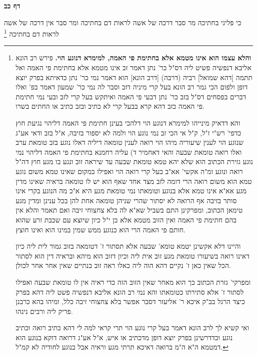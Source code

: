 \documentclass[12pt, openany]{book}
\newcommand{\sethebfont}{
\fontsize{10.5pt}{21.0pt} \selectfont
}
\newcommand{\twocol}[1]{
	{\sethebfont \begin{multicols}{2}
			#1
	\end{multicols}}	
}
\newcommand{\sectname}{}
\newcommand{\newsection}[1]{
	\addcontentsline{toc}{section}{#1}
	\renewcommand{\sectname}{#1}	
	\vspace{-\baselineskip}
	\begin{center}
		\textbf{%
\fontsize{16pt}{16pt}\selectfont
			#1}
	\end{center}
	\vspace{-\baselineskip}
	\nopagebreak
}
\newcommand{\footnotecomment}[1]{\footnote{#1}}
\newcommand{\commenta}[1]{\footnotecomment{#1}}
\begin{document}
\newsection{דף כב}
\twocol{כי פליגי בחתיכה  מר סבר דרכה של אשה לראות דם בחתיכה ומר סבר אין דרכה של אשה לראות דם בחתיכה 
\commenta{\textbf{והלא עצמו הוא אינו מטמא אלא בחתימת פי האמה, למימרא דנוגע הוי.}  פירש רב הונא אליבא דנפשיה פשיט ליה דס"ל כר' נתן דאמר זב אינו מטמא אלא בחתימת פי האמה ואל תתמה [דהא שמואל] רביה (דרבה) [דרב הונא] הוא דאמר נמי כר' נתן כדאיתא בפרק יוצא דופן ולפום הכי גמר רב הונא בעל קרי מיניה דזב וסבר לה נמי כר' שמעון דאמר בפ' ואלו דברים בפסחים דס"ל בזב כר' נתן דבעי פי האמה ואיתקש בעל קרי לזב ובעי נמי חתימת פי האמה כזב דהא קרא בבעל קרי לא כתיב ובזב כתיב או החתים בשרו.\par  והא דדאיק מינייהו למימרא דנוגע הוי דלהכי בעינן חתימת פי האמה דליהוי נגיעת חוץ כדפי' רש"י ז"ל, ק"ל אי הכי זב נמי נוגע הוי ולמה לא יספור בזיבה, א"ל בזב ודאי אע"ג שנוגע הוי לענין שיעוריה מיהו הוי רואה לענין טומאה דיליה דאלו נוגע בזב טומאת ערב ואלו רואה טומאת שבעה והאי דאחמיר ד) עליה רחמנא בחתימת פי האמה דליהוי נמי נוגע גזירת הכתוב הוא שלא יהא טמא טומאת שבעה עד שיראה זוב ונגע בו מגע חוץ דה"ל רואה ונוגע ומ"ה אקשי' אא"ב בעל קרי רואה הוי ואפילו במקום שאינו טמא משום נוגע טמא הוא משום רואה הרי דומה לזב מצד אחד שאף הוא יש לו טומאה בראיה שאינו מדין מגע אא"א אינו טמא אלא בנוגע וטומאתו נמי טומאת מגע היא א"כ מה הנוגע בקרי אינו סותר בזיבה אף הרואה לא יסתור שהרי שניהן טומאה אחת להן בכל ענינן ומדין מגע טימאן הכתוב, ומפרקינן התם בשביל שא"א לה בלא צחצוחי זיבה ואם תאמר והלא אין בהם חתימת פי האמה ואין הזוב מטמא אלא כן י"ל כיון שיוצא עם שכבת זרע שהוא חותם פי האמה הרי הוא כנוגע ממש שמין במינו הוא ואינו חוצץ.\par  והיינו דלא אקשינן יטמא טומא' שבעה אלא תסתור ז' דטומאה בזוב גמור לית ליה כיון דאינו רואה בשיעורו טומאת מגע זוב אית ליה וכיון דזוב הוא מיהא ובראיה דין הוא לסתור הכל שאין כאן ז' נקיים דהא הוה ליה כאלו ראה זוב בנתיים שאין אחר אחר לכולן.\par  ומפרקי' גזרת הכתוב כך הוא מאחר שאין הזוב הזה כדי ראיה אין לו טומאת שבעה ואפילו לסתור ז' אלא סתירתו כטומאתו והא נמי רב הונא אליבא דנפשיה פשט ליה דהא בפרק כיצד הרגל בב"ק איכא ר' אליעזר דסבר אפשר בלא צחצוחי זיבה כלל, ומיהו בהא כרבנן פריק ליה ורבים נינהו.\par  ואי קשיא לך לרב הונא דאמר בעל קרי נוגע הוי תרי קראי למה לי דהא כתיב רואה וכתיב נוגע וכדדרשינן בפרק יוצא דופן מדכתיב או איש, א"ל אע"ג דרואה דוקא בנוגע הוא דמטמא ה"א ה"מ ברואה דאיכא תרתי מגע וראיה אבל בנוגע לחודיה לא קמ"ל. }

}
\end{document}
